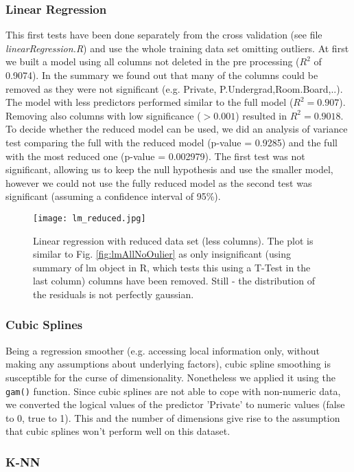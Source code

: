 \documentclass[a4paper]{article}
\begin{document}
\subsubsection{Linear Regression}
This first tests have been done separately from the cross validation (see file \emph{linearRegression.R}) and use the whole training data set omitting outliers.
At first we built a model using all columns not deleted in the pre processing ($R^2$ of 0.9074). In the summary we found out that many of the columns could be removed as they were not significant (e.g. Private, P.Undergrad,Room.Board,..). The model with less predictors performed similar to the full model ($R^2 = 0.907$). Removing also columns with low significance ($> 0.001$) resulted in $R^2 = 0.9018$. To decide whether the reduced model can be used, we did an analysis of variance test comparing the full with the reduced model (p-value = 0.9285) and the full with the most reduced one (p-value = 0.002979). The first test was not significant, allowing us to keep the null hypothesis and use the smaller model, however we could not use the fully reduced model as the second test was significant (assuming a confidence interval of 95\%).

\begin{figure}[H]
	\centering
	\texttt{[image: lm\_reduced.jpg]}
	\caption{\label{fig:linReg}Linear regression with reduced data set (less columns). The plot is similar to Fig. \ref{fig:lmAllNoOulier} as only insignificant (using summary of lm object in R, which tests this using a T-Test in the last column) columns have been removed. Still - the distribution of the residuals is not perfectly gaussian.}
\end{figure}

\subsubsection{Cubic Splines}
Being a regression smoother (e.g. accessing local information only, without making any assumptions about underlying factors), cubic spline smoothing is susceptible for the curse of dimensionality. Nonetheless we applied it using the \texttt{gam()} function.
Since cubic splines are not able to cope with non-numeric data, we converted the logical values of the predictor 'Private' to numeric values (false to 0, true to 1). This and the number of dimensions give rise to the assumption that cubic splines won't perform well on this dataset.

\subsubsection{K-NN}
\end{document}
